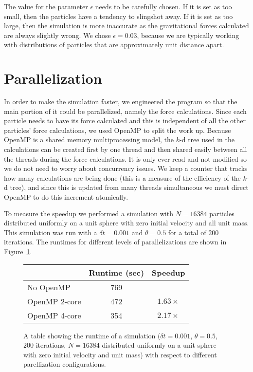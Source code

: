 \documentclass[11pt]{article}
\begin{document}
The value for the parameter $\epsilon$ needs to be carefully chosen.
If it is set as too small, then the particles have a tendency to slingshot away.
If it is set as too large, then the simulation is more inaccurate as the gravitational forces calculated are always slightly wrong.
We chose $\epsilon = 0.03$, because we are typically working with distributions of particles that are approximately unit distance apart.

\section{Parallelization}
In order to make the simulation faster, we engineered the program so that the main portion of it could be parallelized, namely the force calculations.
Since each particle needs to have its force calculated and this is independent of all the other particles' force calculations, we used OpenMP to split the work up.
Because OpenMP is a shared memory multiprocessing model, the $k$-d tree used in the calculations can be created first by one thread and then shared easily between all the threads during the force calculations.
It is only ever read and not modified so we do not need to worry about concurrency issues.
We keep a counter that tracks how many calculations are being done (this is a measure of the efficiency of the $k$-d tree), and since this is updated from many threads simultaneous we must direct OpenMP to do this increment atomically.

To measure the speedup we performed a simulation with $N=16384$ particles distributed uniformly on a unit sphere with zero initial velocity and all unit mass.
This simulation was run with a $\delta t = 0.001$ and $\theta = 0.5$ for a total of $200$ iterations.
The runtimes for different levels of parallelizations are shown in Figure~\ref{speedup}. 

\begin{figure}
\begin{center}
\begin{tabular}{ |l | c  c| }
\hline
& Runtime (sec) & Speedup\\
\hline
No OpenMP & 769 &  \\
OpenMP 2-core & 472 & $1.63\times$ \\
OpenMP 4-core & 354 &  $2.17\times$ \\
\hline
\end{tabular}
\end{center}
\caption{A table showing the runtime of a simulation ($\delta t = 0.001$, $\theta = 0.5$, $200$ iterations, $N=16384$ distributed uniformly on a unit sphere with zero initial velocity and unit mass) with respect to different parellization configurations. }
\label{speedup}
\end{figure}
\end{document}
